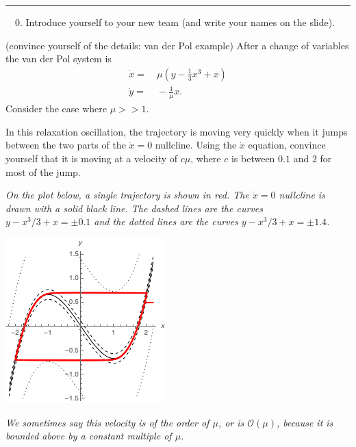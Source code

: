 \documentclass[12pt,letterpaper,noanswers]{exam}
\begin{document}
\eject



\vspace{0.2cm}

\hrule
\vspace{0.2cm}

\noindent \ \ 0.  Introduce yourself to your new team (and write your names on the slide).

\begin{questions}

\item (convince yourself of the details: van der Pol example) After a change of variables the van der Pol system is
\begin{align*}
\dot{x} = &\  \mu(y-\frac{1}{3}x^3 + x) \\
\dot{y} = &\ -\frac{1}{\mu} x.
\end{align*}
Consider the case where $\mu>>1$.
\begin{parts}
\item In this relaxation oscillation, the trajectory is moving very quickly when it jumps between the two parts of the $\dot{x}=0$ nullcline.
Using the $\dot{x}$ equation, convince yourself that it is moving at a velocity of $c\mu$, where $c$ is between $0.1$ and $2$ for most of the jump.  

\emph{On the plot below, a single trajectory is shown in red.  The $\dot x = 0$ nullcline is drawn with a solid black line.  The dashed lines are the curves $y - x^3/3 + x = \pm 0.1$ and the dotted lines are the curves $y - x^3/3 + x = \pm 1.4$.}


\includegraphics{img/191016-C17p3.png}

\emph{We sometimes say this velocity is of the order of $\mu$, or is $\mathcal{O}(\mu)$, because it is bounded above by a constant multiple of $\mu$.}


\end{parts}
\end{questions}
\end{document}
